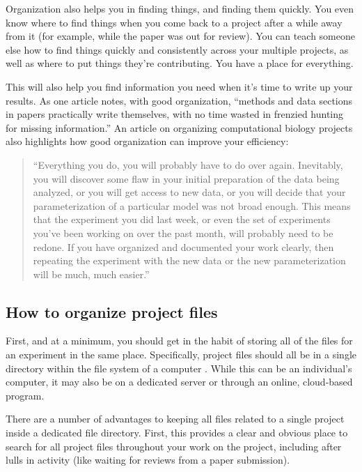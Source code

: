 \documentclass[]{tufte-book}
\begin{document}
Organization also helps you in finding things, and finding them quickly. You
even know where to find things when you come back to a project after a while
away from it (for example, while the paper was out for review). You can teach
someone else how to find things quickly and consistently across your multiple
projects, as well as where to put things they're contributing.
You have a place for everything.

This will also help you find information you need when it's time to write up
your results. As one article notes, with good organization, ``methods and data
sections in papers practically write themselves, with no time wasted in frenzied
hunting for missing information.'' \citep{baker2016quality} An article on organizing
computational biology projects also highlights how good organization can improve
your efficiency:

\begin{quote}
``Everything you do, you will probably have to do over again. Inevitably, you
will discover some flaw in your initial preparation of the data being analyzed,
or you will get access to new data, or you will decide that your
parameterization of a particular model was not broad enough. This means that the
experiment you did last week, or even the set of experiments you've been working
on over the past month, will probably need to be redone. If you have organized
and documented your work clearly, then repeating the experiment with the new
data or the new parameterization will be much, much easier.'' \citep{noble2009quick}
\end{quote}

\subsection{How to organize project files}\label{how-to-organize-project-files}

First, and at a minimum, you should get in the habit of storing all of the files
for an experiment in the same place. Specifically, project files should all be
in a single directory within the file system of a computer \citep{noble2009quick, buffalo2015bioinformatics}. While this can be an individual's computer, it may
also be on a dedicated server or through an online, cloud-based program.

There are a number of advantages to keeping all files related to a single
project inside a dedicated file directory. First, this provides
a clear and obvious place to search for all project files throughout your work
on the project, including after lulls in activity (like waiting for reviews from
a paper submission).
\end{document}
